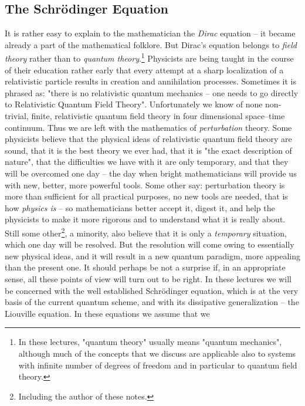 \documentclass[12pt]{article}
\begin{document}
\subsection{The Schr\"odinger Equation}

It is rather easy to explain to the mathematician the {\sl Dirac} equation --
it became already a part of the mathematical folklore.  But Dirac's equation
belongs to {\sl field theory} rather than to
{\sl quantum theory}.\footnote{In
these lectures,  "quantum theory" usually means
"quantum mechanics",  although much of the concepts that we discuss
are applicable also to systems with infinite number of degrees of
freedom and in particular to quantum field theory. } Physicists are being
taught in the course of their education rather early that every attempt at a
sharp localization of a relativistic particle results in creation and
annihilation processes.  Sometimes it is phrased as:  "there is no relativistic
quantum mechanics -- one needs to go directly to Relativistic Quantum Field
Theory".  Unfortunately we know of none non-trivial,  finite,  
relativistic quantum
field theory in four dimensional space--time continuum.  Thus we are left
with the mathematics of {\sl perturbation} theory.  Some physicists believe
that the physical ideas of relativistic quantum field theory are sound,  that
it is the best theory we ever had,  that it is "the exact description of 
nature",  that
the difficulties we have with it are only temporary,  and that they will be 
overcomed one day --
the day when bright mathematicians will provide us with new,  better,  more
powerful tools.  Some other say:  perturbation theory is more than sufficient
for all practical purposes,  no new tools are needed,  that is how {\sl physics
is} -- so mathematicians better accept it,  digest it,  and help the physicists
to make it more rigorous and to understand what it is really about.  Still some
other\footnote{Including the  author of these notes. },  a
minority,  also believe that it is only a {\sl temporary} situation,  which
one day will be resolved.  But the resolution will come
owing to essentially
{new physical ideas}, 
and it will result in a new quantum paradigm,  more appealing than the
present one.  It should perhaps be not a surprise if,  in an appropriate sense,  
all
these points of view will turn out to be right.  In these lectures we will be
concerned with the well established Schr\"odinger equation,  which is at the
very basis of the current quantum scheme,  and with its dissipative
generalization -- the Liouville equation. 
In these equations we assume that we 
\end{document}
